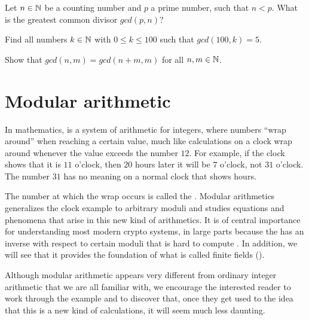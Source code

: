 \begin{exercise}
\label{exercise_towards_counting_numbers}
Let $n\in \mathbb{N}$ be a counting number and $p$ a prime number, such that $n<p$. What is the greatest common divisor $gcd(p,n)$?
\end{exercise}
\begin{exercise}
Find all numbers $k\in\mathbb{N}$ with $0\leq k \leq 100$ such that $gcd(100,k) = 5$.
\end{exercise}
\begin{exercise}
Show that $gcd(n,m) = gcd(n+m,m)$ for all $n,m\in\mathbb{N}$.
\end{exercise}
\section{Modular arithmetic}
\label{modular_arithmetics}
In mathematics,  is a system of arithmetic for integers, where numbers ``wrap around'' when reaching a certain value, much like calculations on a clock wrap around whenever the value exceeds the number $12$. For example, if the clock shows that it is $11$ o'clock, then $20$ hours later it will be $7$ o'clock, not $31$ o'clock. The number $31$ has no meaning on a normal clock that shows hours. 

The number at which the wrap occurs is called the . Modular arithmetics generalizes the clock example to arbitrary moduli and studies equations and phenomena that arise in this new kind of arithmetics. It is of central importance for understanding most modern crypto systems, in large parts because the  has an inverse with respect to certain moduli that is hard to compute . In addition, we will see that it provides the foundation of what is called finite fields ().

Although modular arithmetic appears very different from ordinary integer arithmetic that we are all familiar with, we encourage the interested reader to work through the example and to discover that, once they get used to the idea that this is a new kind of calculations, it will seem much less daunting.

